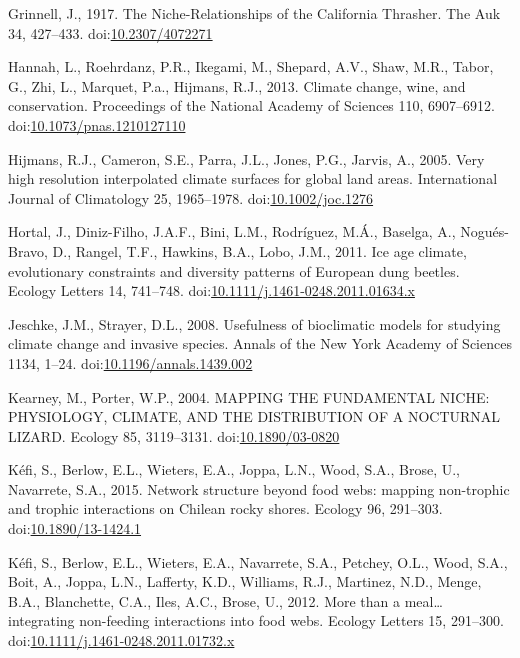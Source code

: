 \hypertarget{ref-Grinnell1917a}{}
Grinnell, J., 1917. The Niche-Relationships of the California Thrasher.
The Auk 34, 427--433.
doi:\href{https://doi.org/10.2307/4072271}{10.2307/4072271}

\hypertarget{ref-Hannah2013}{}
Hannah, L., Roehrdanz, P.R., Ikegami, M., Shepard, A.V., Shaw, M.R.,
Tabor, G., Zhi, L., Marquet, P.a., Hijmans, R.J., 2013. Climate change,
wine, and conservation. Proceedings of the National Academy of Sciences
110, 6907--6912.
doi:\href{https://doi.org/10.1073/pnas.1210127110}{10.1073/pnas.1210127110}

\hypertarget{ref-Hijmans2005}{}
Hijmans, R.J., Cameron, S.E., Parra, J.L., Jones, P.G., Jarvis, A.,
2005. Very high resolution interpolated climate surfaces for global land
areas. International Journal of Climatology 25, 1965--1978.
doi:\href{https://doi.org/10.1002/joc.1276}{10.1002/joc.1276}

\hypertarget{ref-Hortal2011}{}
Hortal, J., Diniz-Filho, J.A.F., Bini, L.M., Rodríguez, M.Á., Baselga,
A., Nogués-Bravo, D., Rangel, T.F., Hawkins, B.A., Lobo, J.M., 2011. Ice
age climate, evolutionary constraints and diversity patterns of European
dung beetles. Ecology Letters 14, 741--748.
doi:\href{https://doi.org/10.1111/j.1461-0248.2011.01634.x}{10.1111/j.1461-0248.2011.01634.x}

\hypertarget{ref-Jeschke2008}{}
Jeschke, J.M., Strayer, D.L., 2008. Usefulness of bioclimatic models for
studying climate change and invasive species. Annals of the New York
Academy of Sciences 1134, 1--24.
doi:\href{https://doi.org/10.1196/annals.1439.002}{10.1196/annals.1439.002}

\hypertarget{ref-Kearney2004}{}
Kearney, M., Porter, W.P., 2004. MAPPING THE FUNDAMENTAL NICHE:
PHYSIOLOGY, CLIMATE, AND THE DISTRIBUTION OF A NOCTURNAL LIZARD. Ecology
85, 3119--3131.
doi:\href{https://doi.org/10.1890/03-0820}{10.1890/03-0820}

\hypertarget{ref-Kefi2015}{}
Kéfi, S., Berlow, E.L., Wieters, E.A., Joppa, L.N., Wood, S.A., Brose,
U., Navarrete, S.A., 2015. Network structure beyond food webs: mapping
non-trophic and trophic interactions on Chilean rocky shores. Ecology
96, 291--303.
doi:\href{https://doi.org/10.1890/13-1424.1}{10.1890/13-1424.1}

\hypertarget{ref-Kefi2012}{}
Kéfi, S., Berlow, E.L., Wieters, E.A., Navarrete, S.A., Petchey, O.L.,
Wood, S.A., Boit, A., Joppa, L.N., Lafferty, K.D., Williams, R.J.,
Martinez, N.D., Menge, B.A., Blanchette, C.A., Iles, A.C., Brose, U.,
2012. More than a meal\ldots{} integrating non-feeding interactions into
food webs. Ecology Letters 15, 291--300.
doi:\href{https://doi.org/10.1111/j.1461-0248.2011.01732.x}{10.1111/j.1461-0248.2011.01732.x}


